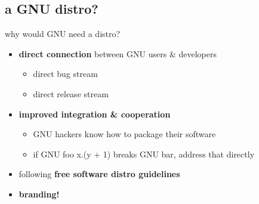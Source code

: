 \documentclass{beamer}
\begin{document}
    






\subsection{a GNU distro?}

\begin{frame}[fragile]{why would GNU need a distro?}
  \begin{itemize}
    \item<1->{\textbf{direct connection} between GNU users \& developers
        \begin{itemize}
        \item direct \alert{bug} stream
        \item direct \alert{release} stream
        \end{itemize}
      }
    \item<2->{\textbf{improved integration \& cooperation}
      \begin{itemize}
      \item GNU hackers \alert{know how} to package their software
      \item if GNU foo x.(y + 1) breaks GNU bar, \alert{address that
          directly}
      \end{itemize}}
    \item<3-> following \textbf{free software distro guidelines}
    \item<4-> \textbf{branding!}
  \end{itemize}
\end{frame}
\end{document}
